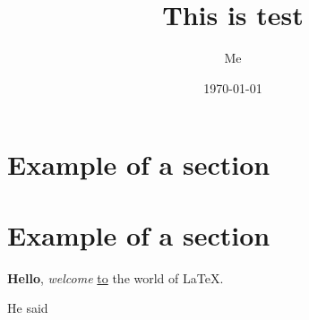 \documentclass[12pt]{article} %
\title{This is test}
\author{Me}
\date{\today}
\begin{document}
\maketitle
\newpage
\thispagestyle{empty}
\tableofcontents
\clearpage

\section{Example of a section}
\section{Example of a section}
\textbf{Hello}, \textit{welcome} \underline{to} the world of \LaTeX.
\begin{comment}
    <?-- doopa -->
    <?-- doopa -->
\end{comment}
He said  %

\blindtext %
\end{document}
